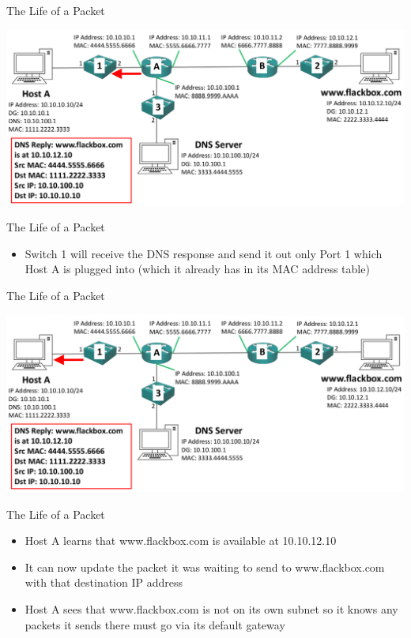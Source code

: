 \documentclass[pdflatex,compress,mathserif]{beamer}
\begin{document}
\begin{frame}{The Life of a Packet}
	\begin{center}
		\includegraphics[width=\linewidth]{img/img38}
	\end{center}
\end{frame}

\begin{frame}{The Life of a Packet}
	\begin{itemize}
		\item Switch 1 will receive the DNS response and send it out only Port 1 which Host A is plugged into (which it already has in its MAC address
		table)
	\end{itemize}
\end{frame}

\begin{frame}{The Life of a Packet}
	\begin{center}
		\includegraphics[width=\linewidth]{img/img39}
	\end{center}
\end{frame}

\begin{frame}{The Life of a Packet}
	\begin{itemize}
		\item Host A learns that www.flackbox.com is available at 10.10.12.10
		\item It can now update the packet it was waiting to send to www.flackbox.com with that destination IP address
		\item Host A sees that www.flackbox.com is not on its own subnet so it knows any packets it sends there must go via its default gateway
	\end{itemize}
\end{frame}
\end{document}
